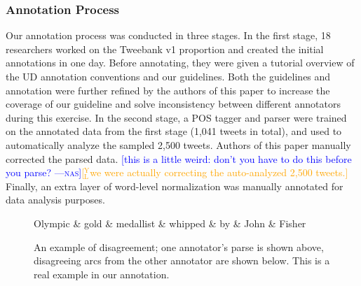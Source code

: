 \documentclass[11pt,a4paper]{article}
\newcommand{\yjcomment}[1]{\textcolor{orange}{[$_\mathrm{L}^\mathrm{Y}$#1]}}
\newcommand{\nascomment}[1]{\textcolor{blue}{[#1 ---\textsc{nas}]}}
\begin{document}
\subsubsection{Annotation Process}
Our annotation process was conducted in three stages.
In the first stage, 18 researchers worked on the {\sc Tweebank v1}
proportion and created the initial annotations in one day.
Before annotating, they were given a tutorial overview of the UD
annotation conventions and our guidelines.
Both the guidelines and annotation
were further refined by the authors of this paper to increase
the coverage of our guideline and solve inconsistency between
different annotators during this exercise. In the second stage, a POS tagger and
parser were trained on the annotated data from the first stage (1,041 tweets in total),
and used to automatically analyze the sampled 2,500 tweets.  Authors 
of this paper manually corrected the parsed data. \nascomment{this is
  a little weird:  don't you have to do this before you parse?}\yjcomment{we were actually correcting the auto-analyzed 2,500 tweets.} Finally, an extra
layer of word-level normalization was manually annotated for data
analysis purposes.

\begin{figure}
\centering
\small
\begin{dependency}[edge slant=2, text only label, label style=above]
	\begin{deptext}
		Olympic \& gold \& medallist \& whipped \& by \& John \& Fisher \\
	\end{deptext}
\end{dependency}
\caption{An example of disagreement; one annotator's parse is shown above, disagreeing arcs from the other
  annotator are shown below. This is a real example in our annotation.}\label{fig:disagree}
\end{figure}
\end{document}
